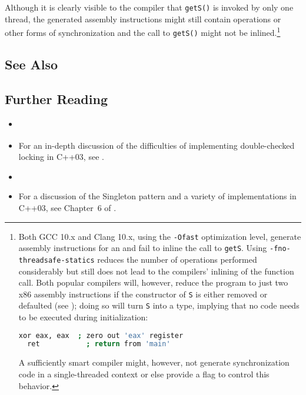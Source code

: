 \noindent Although it is clearly visible to the compiler that \lstinline!getS()! is
invoked by only one thread, the generated assembly instructions might
still contain  operations or other forms of
synchronization and the call to \lstinline!getS()! might not be
inlined.{\cprotect\footnote{Both GCC 10.x and Clang 10.x, using the
\lstinline!-Ofast! optimization level, generate assembly instructions for
an  and fail to inline the call
to \lstinline!getS!. Using \lstinline!-fno-threadsafe-statics! reduces the
number of operations performed considerably but still does not lead to
the compilers' inlining of the function call. Both popular compilers
will, however, reduce the program to just two x86 assembly
instructions if the  constructor of \lstinline!S!
  is either removed or defaulted
   (see );
  doing so will turn \lstinline!S! into a 
  type, implying that no code needs to be executed during
  initialization:\pagebreak[4]

  \begin{lstlisting}[language=bash,style=footcodeplain]
  xor eax, eax  ; zero out 'eax' register
  ret           ; return from 'main'
  \end{lstlisting}

\noindent A sufficiently smart compiler might, however, not generate
  synchronization code in a single-threaded context or else provide a
  flag to control this behavior.
  }}

\subsection[See Also]{See Also}\label{see-also}

\hspace*{\fill}

\subsection[Further Reading]{Further Reading}\label{further-reading}

\begin{itemize}
\item{\cite{meyers04a}}
\item{For an in-depth discussion of the difficulties of implementing double-checked locking in C++03, see \cite{meyers04b}.}
\item{\cite{stroustrup20}}
\item{For a discussion of  the Singleton pattern and a variety of implementations in C++03, see Chapter~6 of \cite{alexandrescu01}.}
\end{itemize}

